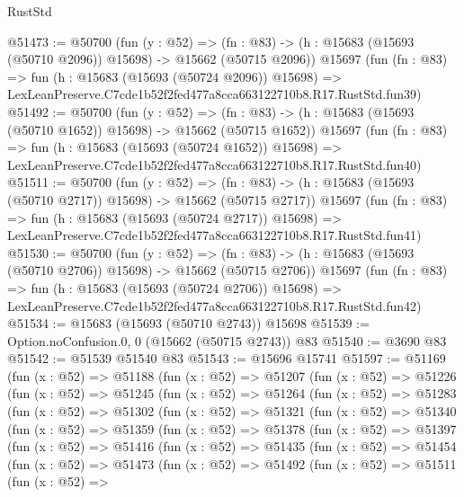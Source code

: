 \begin{lexlean}{RustStd}
\begin{coremodule}
@51473 := @50700
    (fun (y : @52) =>
    (fn : @83) -> (h : @15683 (@15693 (@50710 @2096)) @15698) -> @15662 (@50715 @2096))
    @15697
    (fun (fn : @83) =>
    fun (h : @15683 (@15693 (@50724 @2096)) @15698) =>
    LexLeanPreserve.C7cde1b52f2fed477a8cca663122710b8.R17.RustStd.fun39)
@51492 := @50700
    (fun (y : @52) =>
    (fn : @83) -> (h : @15683 (@15693 (@50710 @1652)) @15698) -> @15662 (@50715 @1652))
    @15697
    (fun (fn : @83) =>
    fun (h : @15683 (@15693 (@50724 @1652)) @15698) =>
    LexLeanPreserve.C7cde1b52f2fed477a8cca663122710b8.R17.RustStd.fun40)
@51511 := @50700
    (fun (y : @52) =>
    (fn : @83) -> (h : @15683 (@15693 (@50710 @2717)) @15698) -> @15662 (@50715 @2717))
    @15697
    (fun (fn : @83) =>
    fun (h : @15683 (@15693 (@50724 @2717)) @15698) =>
    LexLeanPreserve.C7cde1b52f2fed477a8cca663122710b8.R17.RustStd.fun41)
@51530 := @50700
    (fun (y : @52) =>
    (fn : @83) -> (h : @15683 (@15693 (@50710 @2706)) @15698) -> @15662 (@50715 @2706))
    @15697
    (fun (fn : @83) =>
    fun (h : @15683 (@15693 (@50724 @2706)) @15698) =>
    LexLeanPreserve.C7cde1b52f2fed477a8cca663122710b8.R17.RustStd.fun42)
@51534 := @15683 (@15693 (@50710 @2743)) @15698
@51539 := Option.noConfusion.{0, 0} (@15662 (@50715 @2743)) @83
@51540 := @3690 @83
@51542 := @51539 @51540 @83
@51543 := @15696 @15741
@51597 := @51169
    (fun (x : @52) =>
    @51188
      (fun (x : @52) =>
      @51207
        (fun (x : @52) =>
        @51226
          (fun (x : @52) =>
          @51245
            (fun (x : @52) =>
            @51264
              (fun (x : @52) =>
              @51283
                (fun (x : @52) =>
                @51302
                  (fun (x : @52) =>
                  @51321
                    (fun (x : @52) =>
                    @51340
                      (fun (x : @52) =>
                      @51359
                        (fun (x : @52) =>
                        @51378
                          (fun (x : @52) =>
                          @51397
                            (fun (x : @52) =>
                            @51416
                              (fun (x : @52) =>
                              @51435
                                (fun (x : @52) =>
                                @51454
                                  (fun (x : @52) =>
                                  @51473
                                    (fun (x : @52) =>
                                    @51492
                                      (fun (x : @52) =>
                                      @51511
                                        (fun (x : @52) =>

\end{coremodule}
\end{lexlean}
